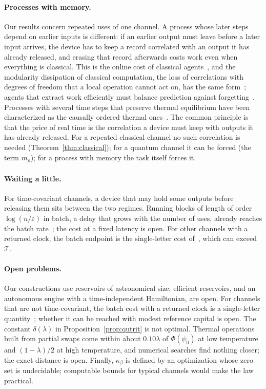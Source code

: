 \documentclass[11pt]{article}
\theoremstyle{definition}
\theoremstyle{remark}
\newcommand{\Tcap}{\mathcal T}
\newcommand{\Trt}{\kappa_\beta}
\begin{document}
\paragraph{Processes with memory.} Our results concern repeated uses of one channel. A process whose later steps depend on earlier inputs is different: if an earlier output must leave before a later input arrives, the device has to keep a record correlated with an output it has already released, and erasing that record afterwards costs work even when everything is classical. This is the online cost of classical agents~\cite{Thompson25}, and the modularity dissipation of classical computation, the loss of correlations with degrees of freedom that a local operation cannot act on, has the same form~\cite{BMC18}; agents that extract work efficiently must balance prediction against forgetting~\cite{Fiderer26}. Processes with several time steps that preserve thermal equilibrium have been characterized as the causally ordered thermal ones~\cite{Milz26}. The common principle is that the price of real time is the correlation a device must keep with outputs it has already released. For a repeated classical channel no such correlation is needed (Theorem~\ref{thm:classical}); for a quantum channel it can be forced (the term $m_\rho$); for a process with memory the task itself forces it.

\paragraph{Waiting a little.} For time-covariant channels, a device that may hold some outputs before releasing them sits between the two regimes. Running blocks of length of order $\log(n/\varepsilon)$ in batch, a delay that grows with the number of uses, already reaches the batch rate~\cite{TimeOrder}; the cost at a fixed latency is open. For other channels with a returned clock, the batch endpoint is the single-letter cost of~\cite{KeepingTime}, which can exceed $\Tcap$.

\paragraph{Open problems.} Our constructions use reservoirs of astronomical size; efficient reservoirs, and an autonomous engine with a time-independent Hamiltonian, are open. For channels that are not time-covariant, the batch cost with a returned clock is a single-letter quantity~\cite{KeepingTime}; whether it can be reached with modest reference capital is open. The constant $\delta(\lambda)$ in Proposition~\ref{prop:qutrit} is not optimal. Thermal operations built from partial swaps come within about $0.10\lambda$ of $\Phi(\psi_0)$ at low temperature and $(1-\lambda)/2$ at high temperature, and numerical searches find nothing closer; the exact distance is open. Finally, $\Trt$ is defined by an optimization whose zero set is undecidable; computable bounds for typical channels would make the law practical.
\end{document}
